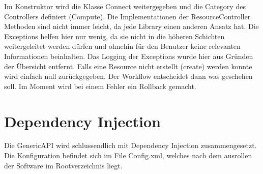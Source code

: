 Im Konstruktor wird die Klasse Connect weitergegeben und die Category des 
Controllers definiert (Compute). Die Implementationen der ResourceController 
Methoden sind nicht immer leicht, da jede Library einen anderen Ansatz hat. 
Die Exceptions helfen hier nur wenig, da sie nicht in die höheren Schichten weitergeleitet werden 
dürfen und ohnehin für den Benutzer keine relevanten Informationen beinhalten. Das Logging der
 Exceptions wurde hier aus Gründen der Übersicht entfernt. Falls eine Resource nicht erstellt (create) 
 werden konnte wird einfach null zurückgegeben. Der Workflow entscheidet dann was geschehen soll. 
 Im Moment wird bei einem Fehler ein Rollback gemacht.

\section{Dependency Injection}
Die GenericAPI wird schlussendlich mit Dependency Injection zusammengesetzt. 
Die Konfiguration befindet sich im File Config.xml, welches nach dem ausrollen der Software
im Rootverzeichnis liegt.

